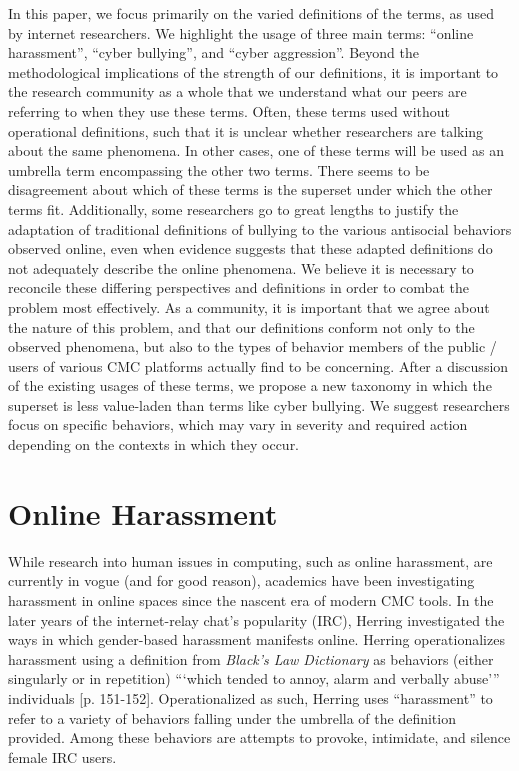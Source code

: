 \documentclass{sigchi}
\begin{document}
In this paper, we focus primarily on the varied definitions of the terms, as used by internet researchers.  We highlight the usage of three main terms: ``online harassment'', ``cyber bullying'', and ``cyber aggression''.  Beyond the methodological implications of the strength of our definitions, it is important to the research community as a whole that we understand what our peers are referring to when they use these terms.  Often, these terms used without operational definitions, such that it is unclear whether researchers are talking about the same phenomena.  In other cases, one of these terms will be used as an umbrella term encompassing the other two terms.  There seems to be disagreement about which of these terms is the superset under which the other terms fit.  Additionally, some researchers go to great lengths to justify the adaptation of traditional definitions of bullying to the various antisocial behaviors observed online, even when evidence suggests that these adapted definitions do not adequately describe the online phenomena.  We believe it is necessary to reconcile these differing perspectives and definitions in order to combat the problem most effectively.  As a community, it is important that we agree about the nature of this problem, and that our definitions conform not only to the observed phenomena, but also to the types of behavior members of the public / users of various CMC platforms actually find to be concerning.  After a discussion of the existing usages of these terms, we propose a new taxonomy in which the superset is less value-laden than terms like cyber bullying.  We suggest researchers focus on specific behaviors, which may vary in severity and required action depending on the contexts in which they occur.

\section{Online Harassment}

While research into human issues in computing, such as online harassment, are currently in vogue (and for good reason), academics have been investigating harassment in online spaces since the nascent era of modern CMC tools.  In the later years of the internet-relay chat's popularity (IRC), Herring \cite{Herring1999Rhetorical} investigated the ways in which gender-based harassment manifests online.  Herring operationalizes harassment using a definition from \textit{Black's Law Dictionary} as behaviors (either singularly or in repetition) ```which tended to annoy, alarm and verbally abuse''' individuals [p. 151-152].  Operationalized as such, Herring uses ``harassment'' to refer to a variety of behaviors falling under the umbrella of the definition provided.  Among these behaviors are attempts to provoke, intimidate, and silence female IRC users.  
\end{document}

